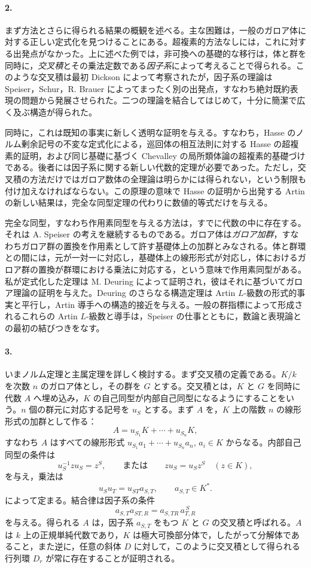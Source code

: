 \paragraph{2.}
まず方法とさらに得られる結果の概観を述べる。主な困難は，一般のガロア体に対する正しい定式化を見つけることにある。超複素的方法なしには，これに対する出発点がなかった。上に述べた例では，非可換への基礎的な移行は，体と群を同時に，\emph{交叉積}とその乗法定数である\emph{因子系}によって考えることで得られる。このような交叉積は最初 Dickson によって考察されたが，因子系の理論は Speiser，Schur，R. Brauer によってまったく別の出発点，すなわち絶対既約表現の問題から発展させられた。二つの理論を結合してはじめて，十分に簡潔で広く及ぶ構造が得られた。

同時に，これは既知の事実に新しく透明な証明を与える。すなわち，Hasse のノルム剰余記号の不変な定式化による，巡回体の相互法則に対する Hasse の超複素的証明，および同じ基礎に基づく Chevalley の局所類体論の超複素的基礎づけである。後者には因子系に関する新しい代数的定理が必要であった。ただし，交叉積の方法だけではガロア数体の全理論は明らかには得られない，という制限も付け加えなければならない。この原理の意味で Hasse の証明から出発する Artin の新しい結果は，完全な同型定理の代わりに数値的等式だけを与える。

完全な同型，すなわち作用素同型を与える方法は，すでに代数の中に存在する。それは A. Speiser の考えを継続するものである。ガロア体は\emph{ガロア加群}，すなわちガロア群の置換を作用素として許す基礎体上の加群とみなされる。体と群環との間には，元が一対一に対応し，基礎体上の線形形式が対応し，体におけるガロア群の置換が群環における乗法に対応する，という意味で作用素同型がある。私が定式化した定理は M. Deuring によって証明され，彼はそれに基づいてガロア理論の証明を与えた。Deuring のさらなる構造定理は Artin \(L\)-級数の形式的事実と平行し，Artin 導手への構造的接近を与える。一般の群指標によって形成されるこれらの Artin \(L\)-級数と導手は，Speiser の仕事とともに，数論と表現論との最初の結びつきをなす。

\paragraph{3.}
いまノルム定理と主属定理を詳しく検討する。まず交叉積の定義である。\(K/k\) を次数 \(n\) のガロア体とし，その群を \(G\) とする。交叉積とは，\(K\) と \(G\) を同時に代数 \(A\) へ埋め込み，\(K\) の自己同型が内部自己同型になるようにすることをいう。\(n\) 個の群元に対応する記号を \(u_S\) とする。まず \(A\) を，\(K\) 上の階数 \(n\) の線形形式の加群として作る：
\[
        A=u_{S_1}K+\cdots+u_{S_n}K ,
\]
すなわち \(A\) はすべての線形形式 \(u_{S_1}a_1+\cdots+u_{S_n}a_n\), \(a_i\in K\) からなる。内部自己同型の条件は
\[
        u_S^{-1}zu_S=z^S,\qquad\text{または}\qquad
        zu_S=u_Sz^S\quad (z\in K),
\]
を与え，乗法は
\[
        u_Su_T=u_{ST}a_{S,T},\qquad a_{S,T}\in K^* .
\]
によって定まる。結合律は因子系の条件
\[
        a_{S,T}a_{ST,R}=a_{S,TR}\,a_{T,R}^{\,S}
\]
を与える。得られる \(A\) は，因子系 \(a_{S,T}\) をもつ \(K\) と \(G\) の交叉積と呼ばれる。\(A\) は \(k\) 上の正規単純代数であり，\(K\) は極大可換部分体で，したがって分解体であること，また逆に，任意の斜体 \(D\) に対して，このように交叉積として得られる行列環 \(D_r\) が常に存在することが証明される。

